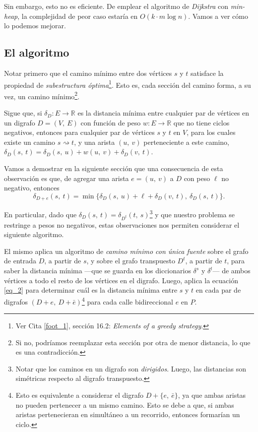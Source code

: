Sin embargo, esto no es eficiente. De emplear el algoritmo de \textit{Dijkstra} con \textit{min-heap}, la complejidad de peor caso estaría en $O(k\cdot m\log n)$. Vamos a ver cómo lo podemos mejorar. 

\subsection{El algoritmo}

Notar primero que el camino mínimo entre dos vértices $s$ y $t$ satisface la propiedad de \textit{subestructura óptima}\footnote{Ver Cita \ref{foot_1}, sección 16.2: \textit{Elements of a greedy strategy}.}. Esto es, cada sección del camino forma, a su vez, un camino mínimo\footnote{Si no, podríamos reemplazar esta sección por otra de menor distancia, lo que es una contradicción.}. 

Sigue que, si $\delta_D : E \to \mathbb{R}$ es la distancia mínima entre cualquier par de vértices en un digrafo $D = (V,\ E)$ con función de peso $w: E \to \mathbb{R}$ que no tiene ciclos negativos, entonces para cualquier par de vértices $s$ y $t$ en $V$, para los cuales existe un camino $s \rightsquigarrow t$, y una arista $(u,\ v)$ perteneciente a este camino, $\delta_D(s,\ t) = \delta_D(s,\ u) + w(u,\ v) + \delta_D(v,\ t)$.

Vamos a demostrar en la siguiente sección que una consecuencia de esta observación es que, de agregar una arista $e = (u,\ v)$ a $D$ con peso $\ell$ no negativo, entonces 
\begin{equation}\label{eq_2}
    \delta_{D + e}(s,\ t) = \min\{\delta_{D}(s,\ u) + \ell + \delta_{D}(v,\ t),\ \delta_{D}(s,\ t)\}.
\end{equation}

En particular, dado que $\delta_D(s,\ t) = \delta_{D^t}(t,\ s)$\footnote{ Notar que los caminos en un digrafo son \textit{dirigidos}. Luego, las distancias son simétricas respecto al digrafo transpuesto.} y que nuestro problema se restringe a pesos no negativos, estas observaciones nos permiten considerar el siguiente algoritmo.



El mismo aplica un algoritmo de \textit{camino mínimo con única fuente} sobre el grafo de entrada $D$, a partir de $s$, y sobre el grafo transpuesto $D^t$, a partir de $t$, para saber la distancia mínima ---que se guarda en los diccionarios $\delta^s$ y $\delta^t$--- de ambos vértices a todo el resto de los vértices en el digrafo. Luego, aplica la ecuación \ref{eq_2} para determinar cuál es la distancia mínima entre $s$ y $t$ en cada par de digrafos $(D + e,\ D + \bar{e})$\footnote{Esto es equivalente a considerar el digrafo $D + \{e,\ \bar{e}\}$, ya que ambas aristas no pueden pertenecer a un mismo camino. Esto se debe a que, si ambas aristas pertenecieran en simultáneo a un recorrido, entonces formarían un ciclo.} para cada calle bidireccional $e$ en $P$.

